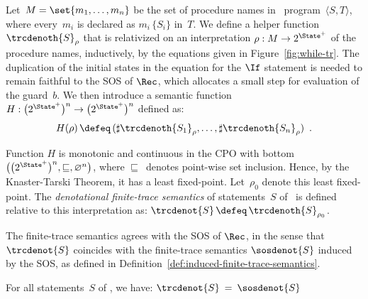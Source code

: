 \documentclass[a4paper,numberwithinsect]{lipics-v2021}
\begin{document}
\begin{definition}
\label{def:while-tr}
Let~$M = \set{m_1,\ldots,m_n}$ be the set of procedure names in \Rec\
program~$\langle S,T\rangle$, where every~$m_i$ is declared as
$m_i\,\{S_i\}$ in~$T$.
%
We define a helper function $\trcdenoth{S}_\rho$ that is relativized
on an interpretation $\rho : M \rightarrow 2^{\State^+}$ of the
procedure names, inductively, by the equations given in
Figure~\ref{fig:while-tr}.
%
The duplication of the initial states in the equation for the $\If$
statement is needed to remain faithful to the SOS of $\Rec$, which
allocates a small step for evaluation of the guard~$b$.
%
We then introduce a semantic function
$ H : \bigl(2^{\State^+}\bigr)^n \rightarrow \bigl(2^{\State^+}\bigr)^n $ 
defined as:
$$
H (\rho) \,\defeq\, (\sharp \trcdenoth{S_1}_\rho, \ldots, \sharp \trcdenoth{S_n}_\rho)\enspace .
$$

Function $H$ is monotonic and continuous in the CPO with bottom
$\bigl(\bigl(2^{\State^+}\bigr)^n, \sqsubseteq, \varnothing^n\bigr)$,
where $\sqsubseteq$~denotes point-wise set inclusion.  Hence, by the
Knaster-Tarski Theorem, it has a least fixed-point.
%
Let~$\rho_0$ denote this least fixed-point.
%
The \emph{denotational finite-trace semantics} of statements~$S$
of \Rec\ is defined relative to this inter\-pretation as:
%
$ \trcdenot{S} \,\defeq\, \trcdenoth{S}_{\rho_0} $.
\end{definition}



The finite-trace semantics agrees with the SOS of $\Rec$, in the sense
that $\trcdenot{S}$ coincides with the finite-trace semantics
$\sosdenot{S}$ induced by the SOS, as defined in
Definition~\ref{def:induced-finite-trace-semantics}.

\begin{theorem}
\label{thm:semantics-correctness-rec}
For all statements~$S$ of \Rec, we have:
$ \trcdenot{S} \>=\> \sosdenot{S} $
\end{theorem}


\end{document}
